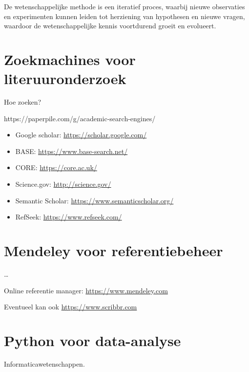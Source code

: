 \documentclass[
  letterpaper,
  DIV=11,
  numbers=noendperiod]{scrreprt}
\begin{document}
De wetenschappelijke methode is een iteratief proces, waarbij nieuwe
observaties en experimenten kunnen leiden tot herziening van hypothesen
en nieuwe vragen, waardoor de wetenschappelijke kennis voortdurend
groeit en evolueert.


\hypertarget{zoekmachines-voor-literuuronderzoek}{%
\chapter{Zoekmachines voor
literuuronderzoek}\label{zoekmachines-voor-literuuronderzoek}}

Hoe zoeken?

https://paperpile.com/g/academic-search-engines/

\begin{itemize}
\item
  Google scholar: \url{https://scholar.google.com/}
\item
  BASE: \url{https://www.base-search.net/}
\item
  CORE: \url{https://core.ac.uk/}
\item
  Science.gov: \url{http://science.gov/}
\item
  Semantic Scholar: \url{https://www.semanticscholar.org/}
\item
  RefSeek: \url{https://www.refseek.com/}
\end{itemize}


\hypertarget{mendeley-voor-referentiebeheer}{%
\chapter{Mendeley voor
referentiebeheer}\label{mendeley-voor-referentiebeheer}}

\ldots{}

Online referentie manager: \url{https://www.mendeley.com}

Eventueel kan ook \url{https://www.scribbr.com}


\hypertarget{python-voor-data-analyse}{%
\chapter{Python voor data-analyse}\label{python-voor-data-analyse}}

Informaticawetenschappen.
\end{document}
